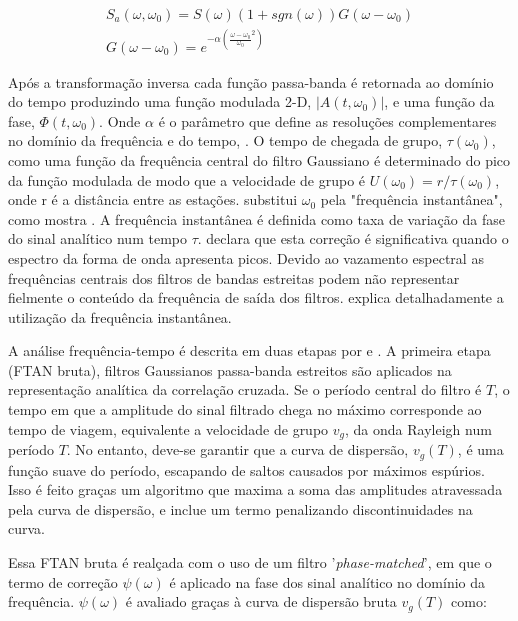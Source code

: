 \begin{eqnarray}
S_{a}(\omega,\omega _{0}) = S(\omega)(1 + sgn(\omega))G(\omega - \omega _{0})
\\
G(\omega - \omega _{0}) = e^{-\alpha(\frac{\omega - \omega _{0}}{\omega _{0}}^{2})}
\end{eqnarray}

Após a transformação inversa cada função passa-banda é retornada ao domínio do tempo produzindo uma função modulada 2-D, $\left | A(t,\omega _{0}) \right |$, e uma função da fase, $ \Phi(t,\omega _{0}) $. Onde $\alpha$ é o parâmetro que define as resoluções complementares no domínio da frequência e do tempo, \cite{levshin_automated_2001}. O tempo de chegada de grupo, $\tau (\omega _{0})$, como uma função da frequência central do filtro Gaussiano é determinado do pico da função modulada de modo que a velocidade de grupo é $U(\omega _{0})=r/\tau (\omega _{0})$, onde r é a distância entre as estações. \cite{bensen_processing_2007} substitui $\omega _{0}$ pela "frequência instantânea", como mostra \cite{bracewell_fourier_1978}. A frequência instantânea é definida como taxa de variação da fase do sinal analítico num tempo $\tau$. \cite{bensen_processing_2007} declara que esta correção é significativa quando o espectro da forma de onda apresenta picos. Devido ao vazamento espectral as frequências centrais dos filtros de bandas estreitas podem não representar fielmente o conteúdo da frequência de saída dos filtros. \cite{boashash_estimating_1992} explica detalhadamente a utilização da frequência instantânea.

A análise frequência-tempo é descrita em duas etapas por \cite{levshin_automated_2001} e \cite{bensen_processing_2007}. A primeira etapa (FTAN bruta), filtros Gaussianos passa-banda estreitos são aplicados na representação analítica da correlação cruzada. Se o período central do filtro é $T$, o tempo em que a amplitude do sinal filtrado chega no máximo corresponde ao tempo de viagem, equivalente a velocidade de grupo $v_{g}$, da onda Rayleigh num período $T$. No entanto, deve-se garantir que a curva de dispersão, $v_{g}(T)$, é uma função suave do período, escapando de saltos causados por máximos espúrios. Isso é feito graças um algoritmo que maxima a soma das amplitudes atravessada pela curva de dispersão, e inclue um termo penalizando discontinuidades na curva.

Essa FTAN bruta é realçada com o uso de um filtro '\textit{phase-matched}', em que o termo de correção $\psi(\omega)$ é aplicado na fase dos sinal analítico no domínio da frequência. $\psi(\omega)$ é avaliado graças à curva de dispersão bruta $v_{g}(T)$ como:

